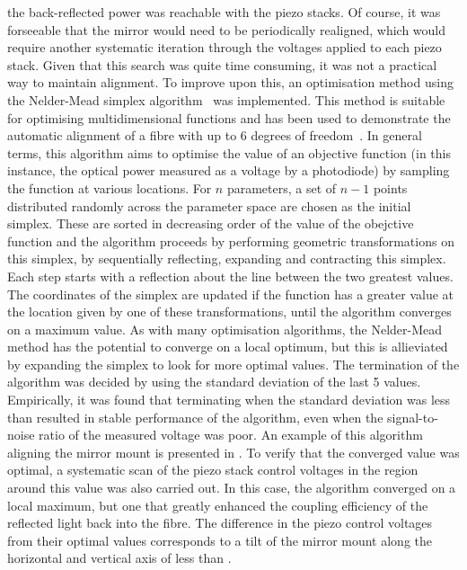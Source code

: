 the back-reflected power was reachable with the piezo stacks. Of course, it
was forseeable that the mirror would need to be periodically realigned, which
would require another systematic iteration through the voltages applied to
each piezo stack. Given that this search was quite time consuming, it was not
a practical way to maintain alignment. To improve upon this, an optimisation
method using the Nelder-Mead simplex algorithm~\cite{Nelder1965} was
implemented. This method is suitable for optimising multidimensional
functions and has been used to demonstrate the automatic alignment of a fibre
with up to 6 degrees of freedom~\cite{Zhang2004}. In general terms, this
algorithm aims to optimise the value of an objective function (in this
instance, the optical power measured as a voltage by a photodiode) by
sampling the function at various locations. For \(n\) parameters, a set of
\(n-1\) points distributed randomly across the parameter space are chosen as
the initial simplex. These are sorted in decreasing order of the value of the
obejctive function and the algorithm proceeds by performing geometric
transformations on this simplex, by sequentially reflecting, expanding and
contracting this simplex. Each step starts with a reflection about the line
between the two greatest values. The coordinates of the simplex are updated
if the function has a greater value at the location given by one of these
transformations, until the algorithm converges on a maximum value. As with
many optimisation algorithms, the Nelder-Mead method has the potential to
converge on a local optimum, but this is allieviated by expanding the simplex
to look for more optimal values. The termination of the algorithm was decided
by using the standard deviation of the last 5 values. Empirically, it was
found that terminating when the standard deviation was less than
 resulted in stable performance of the algorithm,
even when the signal-to-noise ratio of the measured voltage was poor. An
example of this algorithm aligning the mirror mount is presented in
. To verify that the converged value was
optimal, a systematic scan of the piezo stack control voltages in the region
around this value was also carried out. In this case, the algorithm converged
on a local maximum, but one that greatly enhanced the coupling efficiency of
the reflected light back into the fibre. The difference in the piezo control
voltages from their optimal values corresponds to a tilt of the mirror mount
along the horizontal and vertical axis of less than
.
